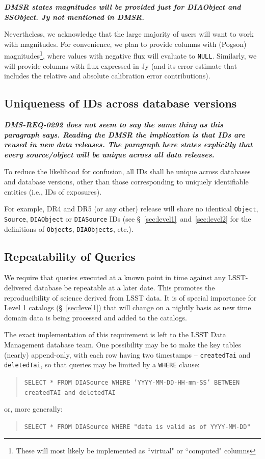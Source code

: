 \documentclass[12pt]{article}
\newcommand{\code}[1]{\texttt{#1}}
\newcommand{\annotate}[1]{{\color{magenta}\large\textbf{\emph{#1}}}}
\newcommand{\DIASource}{\code{DIASource}\xspace}
\newcommand{\DIAObject}{\code{DIAObject}\xspace}
\newcommand{\DIAObjects}{\code{DIAObjects}\xspace}
\newcommand{\Object}{\code{Object}\xspace}
\newcommand{\Objects}{\code{Objects}\xspace}
\newcommand{\Source}{\code{Source}\xspace}
\newcommand{\req}[1]{\marginpar{\tiny #1}}
\newcommand{\dmreq}[1]{\req{DMS-REQ-#1}}
\begin{document}
\annotate{DMSR states magnitudes will be provided just for DIAObject and SSObject. Jy not mentioned in DMSR.}

\vspace{1em}
Nevertheless, we acknowledge that the large majority of users will want to work with magnitudes. For convenience, we plan to provide columns with (Pogson) magnitudes\footnote{These will most likely be implemented as ``virtual" or ``computed" columns}, where values with negative flux will evaluate to \code{NULL}. Similarly, we will provide columns with flux expressed in Jy (and its error estimate that includes the relative and absolute calibration error contributions).

\subsection{Uniqueness of IDs across database versions}

\annotate{DMS-REQ-0292 does not seem to say the same thing as this paragraph says. Reading the DMSR the implication is that IDs are reused in new data releases. The paragraph here states explicitly that every source/object will be unique across all data releases.}

\dmreq{0292}
To reduce the likelihood for confusion, all IDs shall be unique across databases and database versions, other than those corresponding to uniquely identifiable entities (i.e., IDs of exposures).

For example, DR4 and DR5 (or any other) release will share no identical \Object, \Source, \DIAObject or \DIASource IDs (see \S~\ref{sec:level1}~and~\ref{sec:level2} for the definitions of \Objects, \DIAObjects, etc.).

\subsection{Repeatability of Queries}
\dmreq{0291}

We require that queries executed at a known point in time against any LSST-delivered database be repeatable at a later date. This promotes the reproducibility of science derived from LSST data. It is of special importance for Level 1 catalogs (\S~\ref{sec:level1}) that will change on a nightly basis as new time domain data is being processed and added to the catalogs.

The exact implementation of this requirement is left to the LSST Data Management database team. One possibility may be to make the key tables (nearly) append-only, with each row having two timestamps -- {\tt createdTai} and {\tt deletedTai}, so that queries may be limited by a \code{WHERE} clause:
%
\begin{quote}
\texttt{SELECT * FROM DIASource WHERE 'YYYY-MM-DD-HH-mm-SS' BETWEEN createdTAI and deletedTAI}
\end{quote}
%
or, more generally:
%
\begin{quote}
\code{SELECT * FROM DIASource WHERE "data is valid as of YYYY-MM-DD"}
\end{quote}
\end{document}
